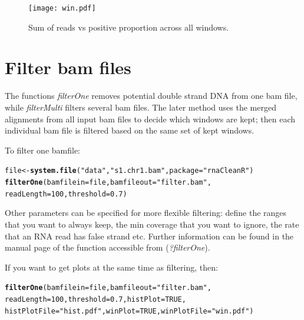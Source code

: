 \documentclass{article}\usepackage[]{graphicx}\usepackage[]{color}
\makeatletter
\newcommand{\hlnum}[1]{\textcolor[rgb]{0.686,0.059,0.569}{#1}}%
\newcommand{\hlstr}[1]{\textcolor[rgb]{0.192,0.494,0.8}{#1}}%
\newcommand{\hlstd}[1]{\textcolor[rgb]{0.345,0.345,0.345}{#1}}%
\newcommand{\hlkwb}[1]{\textcolor[rgb]{0.69,0.353,0.396}{#1}}%
\newcommand{\hlkwc}[1]{\textcolor[rgb]{0.333,0.667,0.333}{#1}}%
\newcommand{\hlkwd}[1]{\textcolor[rgb]{0.737,0.353,0.396}{\textbf{#1}}}%
\newenvironment{kframe}{%
 \def\at@end@of@kframe{}%
 \ifinner\ifhmode%
  \def\at@end@of@kframe{\end{minipage}}%
  \begin{minipage}{\columnwidth}%
 \fi\fi%
 \def\FrameCommand##1{\hskip\@totalleftmargin \hskip-\fboxsep
 \colorbox{shadecolor}{##1}\hskip-\fboxsep
     \hskip-\linewidth \hskip-\@totalleftmargin \hskip\columnwidth}%
 \MakeFramed {\advance\hsize-\width
   \@totalleftmargin\z@ \linewidth\hsize
   \@setminipage}}%
 {\par\unskip\endMakeFramed%
 \at@end@of@kframe}
\newenvironment{knitrout}{}{} %
\makeatother
\begin{document}
\begin{figure}[H]
  \centering
  \texttt{[image: win.pdf]}
  \caption{Sum of reads vs positive proportion across all windows.}
  \label{fig:win}
\end{figure}

\section{Filter bam files}

The functions \textit{filterOne} removes potential double strand DNA from one bam file, while \textit{filterMulti} filters several bam files. The later method uses the merged alignments from all input bam files to decide which windows are kept; then each individual bam file is filtered based on the same set of kept windows.

To filter one bamfile:

\begin{knitrout}
\color{fgcolor}\begin{kframe}
\begin{alltt}
\hlstd{file} \hlkwb{<-} \hlkwd{system.file}\hlstd{(}\hlstr{"data"}\hlstd{,}\hlstr{"s1.chr1.bam"}\hlstd{,}\hlkwc{package} \hlstd{=} \hlstr{"rnaCleanR"}\hlstd{)}
\hlkwd{filterOne}\hlstd{(}\hlkwc{bamfilein} \hlstd{= file,}\hlkwc{bamfileout} \hlstd{=} \hlstr{"filter.bam"}\hlstd{,}
          \hlkwc{readLength} \hlstd{=} \hlnum{100}\hlstd{,} \hlkwc{threshold} \hlstd{=} \hlnum{0.7}\hlstd{)}
\end{alltt}
\end{kframe}
\end{knitrout}

Other parameters can be specified for more flexible filtering: define the ranges that you want to always keep, the min coverage that you want to ignore, the rate that an RNA read has false strand etc. Further information can be found in the manual page of the function accessible from (\textit{?filterOne}).


If you want to get plots at the same time as filtering, then:

\begin{knitrout}
\color{fgcolor}\begin{kframe}
\begin{alltt}
\hlkwd{filterOne}\hlstd{(}\hlkwc{bamfilein} \hlstd{= file,}\hlkwc{bamfileout} \hlstd{=} \hlstr{"filter.bam"}\hlstd{,}
          \hlkwc{readLength} \hlstd{=} \hlnum{100}\hlstd{,} \hlkwc{threshold} \hlstd{=} \hlnum{0.7}\hlstd{,}\hlkwc{histPlot} \hlstd{=} \hlnum{TRUE}\hlstd{,}
          \hlkwc{histPlotFile} \hlstd{=} \hlstr{"hist.pdf"}\hlstd{,}\hlkwc{winPlot} \hlstd{=} \hlnum{TRUE}\hlstd{,}\hlkwc{winPlotFile} \hlstd{=} \hlstr{"win.pdf"}\hlstd{)}
\end{alltt}
\end{kframe}
\end{knitrout}
\end{document}
